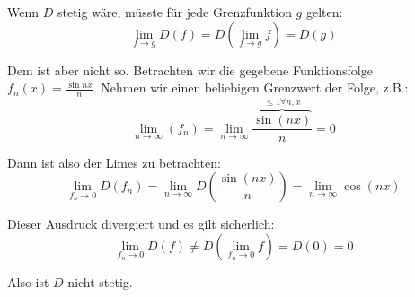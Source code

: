\documentclass[a4paper,german,12pt,smallheadings]{scrartcl}
\begin{document}
Wenn $D$ stetig wäre, müsste für jede Grenzfunktion $g$ gelten:
\begin{equation*}
  \lim\limits_{f\to g} D(f) = D\left(\lim\limits_{f\to g} f\right)=D(g)
\end{equation*}

Dem ist aber nicht so. Betrachten wir die gegebene Funktionsfolge $f_n(x) = \frac{\sin nx}{n}$. Nehmen wir einen beliebigen Grenzwert der Folge, z.B.: 
\begin{equation*}
\lim\limits_{n\to\infty}(f_n)=\lim\limits_{n\to\infty}\frac{\overbrace{\sin(nx)}^{\le 1\forall n,x}}{n}=0
\end{equation*}

Dann ist also der Limes zu betrachten:
\begin{equation*}
 \lim\limits_{f_n\to 0} D(f_n) =  \lim\limits_{n\to \infty} D\left(\frac{\sin(nx)}{n}\right)= \lim\limits_{n\to \infty} \cos(nx)
\end{equation*}

Dieser Ausdruck divergiert und es gilt sicherlich:
\begin{equation*}
  \lim\limits_{f_n\to 0} D(f) \neq D\left(\lim\limits_{f_n\to 0}f\right)=D(0)=0
\end{equation*}

Also ist $D$ nicht stetig.
\end{document}
